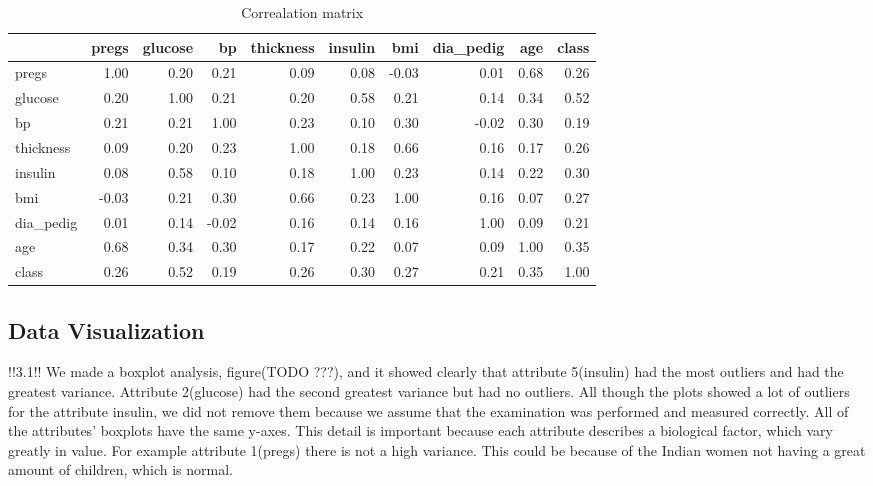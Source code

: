 \begin{table}
\caption{Correalation matrix}
\begin{tabular}{lrrrrrrrrr}
{} &  pregs &  glucose &    bp &  thickness &  insulin &   bmi &  dia\_pedig &   age &  class \\
\midrule
pregs     &   1.00 &     0.20 &  0.21 &       0.09 &     0.08 & -0.03 &       0.01 &  0.68 &   0.26 \\
glucose   &   0.20 &     1.00 &  0.21 &       0.20 &     0.58 &  0.21 &       0.14 &  0.34 &   0.52 \\
bp        &   0.21 &     0.21 &  1.00 &       0.23 &     0.10 &  0.30 &      -0.02 &  0.30 &   0.19 \\
thickness &   0.09 &     0.20 &  0.23 &       1.00 &     0.18 &  0.66 &       0.16 &  0.17 &   0.26 \\
insulin   &   0.08 &     0.58 &  0.10 &       0.18 &     1.00 &  0.23 &       0.14 &  0.22 &   0.30 \\
bmi       &  -0.03 &     0.21 &  0.30 &       0.66 &     0.23 &  1.00 &       0.16 &  0.07 &   0.27 \\
dia\_pedig &   0.01 &     0.14 & -0.02 &       0.16 &     0.14 &  0.16 &       1.00 &  0.09 &   0.21 \\
age       &   0.68 &     0.34 &  0.30 &       0.17 &     0.22 &  0.07 &       0.09 &  1.00 &   0.35 \\
class     &   0.26 &     0.52 &  0.19 &       0.26 &     0.30 &  0.27 &       0.21 &  0.35 &   1.00 \\
\bottomrule
\end{tabular}
\end{table}

\subsection{Data Visualization}

!!3.1!!
We made a boxplot analysis, figure(TODO ???), and it showed clearly that attribute 5(insulin) had the most outliers
and had the greatest variance. Attribute 2(glucose) had the second greatest variance but had no outliers.
All though the plots showed a lot of outliers for the attribute insulin, we did not remove them because we
assume that the examination was performed and measured correctly.
All of the attributes' boxplots have the same y-axes. This detail is important because each attribute describes a
biological factor, which vary greatly in value.
For example attribute 1(pregs) there is not a high variance. This could be because of the Indian women not having
a great amount of children, which is normal.

